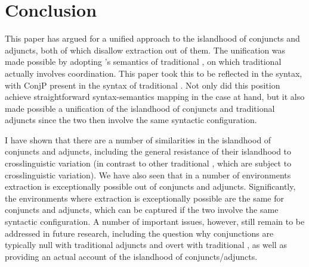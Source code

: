 \documentclass[output=paper]{langsci/langscibook}
\begin{document}
\section{Conclusion}

This paper has argued for a unified approach to the islandhood of conjuncts and
adjuncts, both of which disallow extraction out of them. The unification was
made possible by adopting \citeauthor{Higginbotham1985}’s semantics of
traditional , on which traditional  actually involves
coordination. This paper took this to be reflected in the syntax, with ConjP
present in the syntax of traditional  \parencite[see
also][]{Progovac1998,Progovac1999}. Not only did this position achieve
straightforward syntax-semantics mapping in the case at hand, but it also made
possible a unification of the islandhood of conjuncts and traditional adjuncts
since the two then involve the same syntactic configuration.

I have shown that there are a number of similarities in the islandhood of
conjuncts and adjuncts, including the general resistance of their islandhood to
crosslinguistic variation (in contrast to other traditional , which are
subject to crosslinguistic variation). We have also seen that in a number of
environments extraction is exceptionally possible out of conjuncts and
adjuncts. Significantly, the environments where extraction is exceptionally
possible are the same for conjuncts and adjuncts, which can be captured if the
two involve the same syntactic configuration. A number of important issues,
however, still remain to be addressed in future research, including the
question why conjunctions are typically null with traditional adjuncts and
overt with traditional , as well as providing an actual account of
the islandhood of conjuncts/adjuncts.
\end{document}
